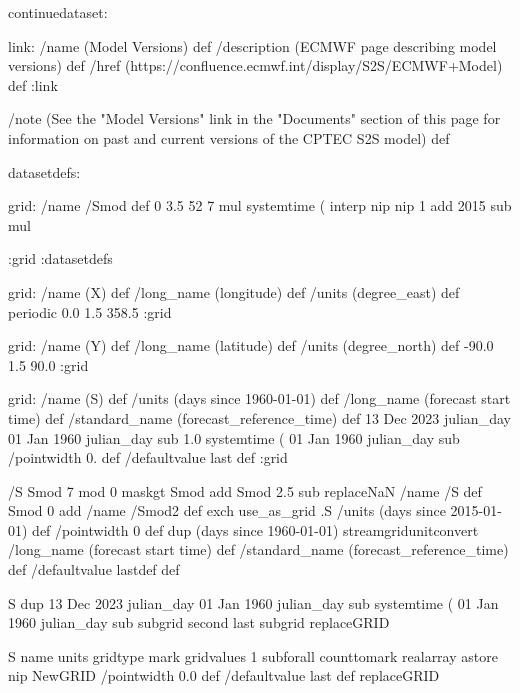 \begin{ingrid}
continuedataset:

link:
 /name (Model Versions) def
 /description (ECMWF page describing model versions) def
 /href (https://confluence.ecmwf.int/display/S2S/ECMWF+Model) def
:link

/note (See the "Model Versions" link in the "Documents" section of this page for information on past and current versions of the CPTEC S2S model) def

datasetdefs:

grid:
   /name /Smod def
   0 3.5 52
        7 mul
         systemtime
        (%
        interp nip nip 1 add
        2015 sub mul


:grid
:datasetdefs

grid:
/name (X) def
/long_name (longitude) def
/units (degree_east) def
periodic
0.0 1.5 358.5
:grid

grid:
/name (Y) def
/long_name (latitude) def
/units (degree_north) def
-90.0 1.5 90.0
:grid

grid:
/name (S) def
/units (days since 1960-01-01) def
/long_name (forecast start time) def
/standard_name (forecast_reference_time) def
13 Dec 2023 julian_day 01 Jan 1960 julian_day sub
1.0
systemtime
(%
01 Jan 1960 julian_day sub
/pointwidth 0. def
/defaultvalue { last } def
:grid

 /S Smod
    7 mod
    0 maskgt
    Smod add
    Smod
     2.5 sub
     replaceNaN
    /name /S def
    Smod
     0 add
     /name /Smod2 def
     exch use_as_grid
    .S
    /units (days since 2015-01-01) def
    /pointwidth 0 def
     dup
     (days since 1960-01-01) streamgridunitconvert
    /long_name (forecast start time) def
    /standard_name (forecast_reference_time) def
    /defaultvalue {last}def
    def

     S dup 13
     Dec 2023 julian_day
     01
      Jan 1960 julian_day
      sub
      systemtime
      (%
      01 Jan 1960 julian_day sub
     subgrid
     second last subgrid
    replaceGRID

 S name units gridtype mark gridvalues
          {1 sub}forall counttomark realarray astore
          nip NewGRID
      /pointwidth 0.0 def
      /defaultvalue { last } def
      replaceGRID


\end{ingrid}

